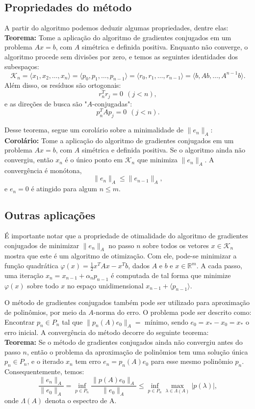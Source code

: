 \documentclass[a4paper,11pt]{article}
\begin{document}
    \subsection{Propriedades do método}
        A partir do algoritmo podemos deduzir algumas propriedades, dentre elas: \\
        \textbf{Teorema:} Tome a aplicação do algoritmo de gradientes conjugados em um problema $Ax=b$, com $A$ simétrica e definida positiva. Enquanto não converge, o algoritmo procede sem divisões por zero, e temos as seguintes identidades dos subespaços:
        $$
            \mathcal{K}_n = \langle x_1, x_2, \dots, x_n  \rangle = \langle p_0, p_1, \dots, p_{n-1}  \rangle = \langle r_0, r_1, \dots, r_{n-1}  \rangle = \langle b, Ab, \dots, A^{n-1}b  \rangle.
        $$
        Além disso, os resíduos são ortogonais:
        $$
            r^T_nr_j = 0\ \ (j<n),
        $$
        e as direções de busca são "$A$-conjugadas":
        $$
            p^T_nAp_j = 0\ \ (j<n).
        $$
        
        Desse teorema, segue um corolário sobre a minimalidade de $\| e_n \|_A$: \\
        \textbf{Corolário:}  Tome a aplicação do algoritmo de gradientes conjugados em um problema $Ax=b$, com $A$ simétrica e definida positiva. Se o algoritmo ainda não convergiu, então $x_n$ é o único ponto em $\mathcal{K}_n$ que minimiza $\| e_n \|_A$. A convergência é monótona,
        $$
            \| e_n \|_A \leq \| e_{n-1} \|_A,
        $$
        e $e_n = 0$ é atingido para algum $n \leq m$.
    
    \subsection{Outras aplicações}
        É importante notar que a propriedade de otimalidade do algoritmo de gradientes conjugados de minimizar  $\| e_n \|_A$ no passo $n$ sobre todos os vetores $x \in \mathcal{K}_n$ mostra que este é um algoritmo de otimização. Com ele, pode-se minimizar a função quadrática $\varphi(x) =  \frac{1}{2}x^TAx-x^Tb$, dados $A$ e $b$ e $x \in \mathbb{R}^m$. A cada passo, uma iteração $x_n = x_{n-1}+ \alpha_np_{n-1}$ é computada de tal forma que minimize $\varphi(x)$ sobre todo $x$ no espaço unidimensional $x_{n-1}+ \langle p_{n-1} \rangle$.
        
        O método de gradientes conjugados também pode ser utilizado para aproximação de polinômios, por meio da $A$-norma do erro. O problema pode ser descrito como: Encontrar $p_n \in P_n$ tal que $\| p_n (A) e_0 \|_A =$ mínimo, sendo $e_0=x_*-x_0=x_*$ o erro inicial. A convergência do método decorre do seguinte teorema:\\
        \textbf{Teorema:} Se o método de gradientes conjugados ainda não convergiu antes do passo $n$, então o problema da aproximação de polinômios tem uma solução única $p_n \in P_n$, e o iterado $x_n$ tem erro $e_n=p_n(A)e_0$ para esse mesmo polinômio $p_n$. Consequentemente, temos:
         $$
            \frac{\|e_n\|_A}{\|e_0\|_A} = \inf_{p \in P_n} \frac{\|p(A)e_0\|_A}{\|e_0\|_A} \leq \inf_{p \in P_n} \max_{\lambda \in \Lambda(A)} |p(\lambda)|,
         $$
         onde $\Lambda(A)$ denota o espectro de A.
        
\end{document}
